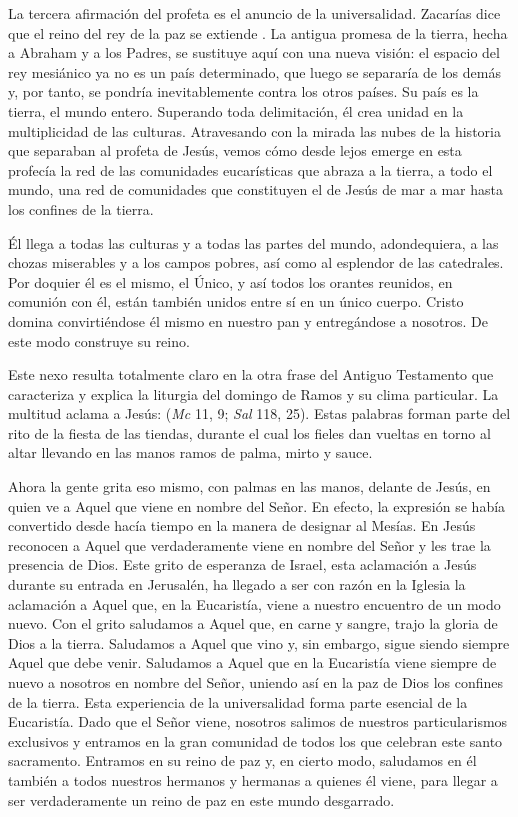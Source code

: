 \begin{body}
La tercera afirmación del profeta es el anuncio de la universalidad. Zacarías dice que el reino del rey de la paz se extiende . La antigua promesa de la tierra, hecha a Abraham y a los Padres, se sustituye aquí con una nueva visión: el espacio del rey mesiánico ya no es un país determinado, que luego se separaría de los demás y, por tanto, se pondría inevitablemente contra los otros países. Su país es la tierra, el mundo entero. Superando toda delimitación, él crea unidad en la multiplicidad de las culturas. Atravesando con la mirada las nubes de la historia que separaban al profeta de Jesús, vemos cómo desde lejos emerge en esta profecía la red de las comunidades eucarísticas que abraza a la tierra, a todo el mundo, una red de comunidades que constituyen el  de Jesús de mar a mar hasta los confines de la tierra.

Él llega a todas las culturas y a todas las partes del mundo, adondequiera, a las chozas miserables y a los campos pobres, así como al esplendor de las catedrales. Por doquier él es el mismo, el Único, y así todos los orantes reunidos, en comunión con él, están también unidos entre sí en un único cuerpo. Cristo domina convirtiéndose él mismo en nuestro pan y entregándose a nosotros. De este modo construye su reino.

Este nexo resulta totalmente claro en la otra frase del Antiguo Testamento que caracteriza y explica la liturgia del domingo de Ramos y su clima particular. La multitud aclama a Jesús:  (\textit{Mc} 11, 9; \textit{Sal} 118, 25). Estas palabras forman parte del rito de la fiesta de las tiendas, durante el cual los fieles dan vueltas en torno al altar llevando en las manos ramos de palma, mirto y sauce.

Ahora la gente grita eso mismo, con palmas en las manos, delante de Jesús, en quien ve a Aquel que viene en nombre del Señor. En efecto, la expresión  se había convertido desde hacía tiempo en la manera de designar al Mesías. En Jesús reconocen a Aquel que verdaderamente viene en nombre del Señor y les trae la presencia de Dios. Este grito de esperanza de Israel, esta aclamación a Jesús durante su entrada en Jerusalén, ha llegado a ser con razón en la Iglesia la aclamación a Aquel que, en la Eucaristía, viene a nuestro encuentro de un modo nuevo. Con el grito  saludamos a Aquel que, en carne y sangre, trajo la gloria de Dios a la tierra. Saludamos a Aquel que vino y, sin embargo, sigue siendo siempre Aquel que debe venir. Saludamos a Aquel que en la Eucaristía viene siempre de nuevo a nosotros en nombre del Señor, uniendo así en la paz de Dios los confines de la tierra. Esta experiencia de la universalidad forma parte esencial de la Eucaristía. Dado que el Señor viene, nosotros salimos de nuestros particularismos exclusivos y entramos en la gran comunidad de todos los que celebran este santo sacramento. Entramos en su reino de paz y, en cierto modo, saludamos en él también a todos nuestros hermanos y hermanas a quienes él viene, para llegar a ser verdaderamente un reino de paz en este mundo desgarrado.


\end{body}

